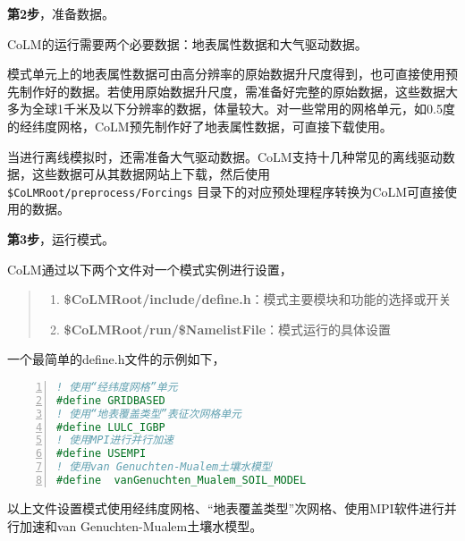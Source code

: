 \documentclass[a4paper,12pt,twoside]{article}
\begin{document}
\bigskip
\textbf{第2步}，准备数据。

CoLM的运行需要两个必要数据：地表属性数据和大气驱动数据。

模式单元上的地表属性数据可由高分辨率的原始数据升尺度得到，也可直接使用预先制作好的数据。若使用原始数据升尺度，需准备好完整的原始数据，这些数据大多为全球1千米及以下分辨率的数据，体量较大。对一些常用的网格单元，如0.5度的经纬度网格，CoLM预先制作好了地表属性数据，可直接下载使用。

当进行离线模拟时，还需准备大气驱动数据。CoLM支持十几种常见的离线驱动数据，这些数据可从其数据网站上下载，然后使用 \texttt{\$CoLMRoot/preprocess/Forcings} 目录下的对应预处理程序转换为CoLM可直接使用的数据。

\bigskip
\textbf{第3步}，运行模式。

CoLM通过以下两个文件对一个模式实例进行设置，
\begin{quote}
\begin{enumerate}[label=\arabic*)]
    \item \textbf{\$CoLMRoot/include/define.h}：模式主要模块和功能的选择或开关
    \item \textbf{\$CoLMRoot/run/\$NamelistFile}：模式运行的具体设置
\end{enumerate}
\end{quote}

一个最简单的define.h文件的示例如下，
\begin{lstlisting}[language=fortran, basicstyle=\linespread{1.2}\footnotesize\ttfamily, commentstyle=\color{olive}, numbers=left, numberstyle=\tiny, xleftmargin=1.5em,xrightmargin=0em, aboveskip=1em]
! 使用“经纬度网格”单元
#define GRIDBASED
! 使用“地表覆盖类型”表征次网格单元
#define LULC_IGBP
! 使用MPI进行并行加速
#define USEMPI
! 使用van Genuchten-Mualem土壤水模型
#define  vanGenuchten_Mualem_SOIL_MODEL
\end{lstlisting}

以上文件设置模式使用经纬度网格、“地表覆盖类型”次网格、使用MPI软件进行并行加速和van Genuchten-Mualem土壤水模型。
\end{document}
